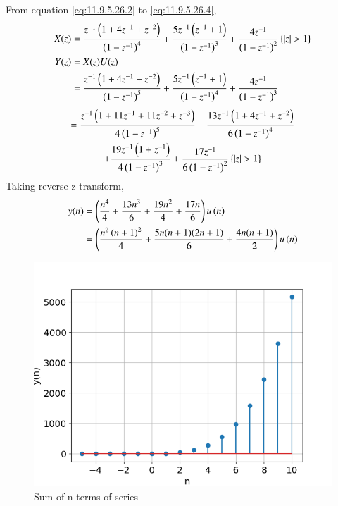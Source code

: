 \documentclass[journal,12pt,twocolumn]{IEEEtran}
\theoremstyle{remark}
\begin{document}
From equation \eqref{eq:11.9.5.26.2} to \eqref{eq:11.9.5.26.4},\\
    \begin{align}
        X(z) &= \frac{z^{-1}\brak{1+4z^{-1}+z^{-2}}}{\brak{1-z^{-1}}^4} + \frac{5z^{-1}\brak{z^{-1}+1}}{\brak{1-z^{-1}}^3} + \frac{4z^{-1}}{\brak{1-z^{-1}}^2} \cbrak{|z|>1}\\
         Y(z) &= X(z)U(z)\\
         &=\frac{z^{-1}\brak{1+4z^{-1}+z^{-2}}}{\brak{1-z^{-1}}^5} + \frac{5z^{-1}\brak{z^{-1}+1}}{\brak{1-z^{-1}}^4} + \frac{4z^{-1}}{\brak{1-z^{-1}}^3} 
    \end{align}
    \begin{multline}
        = \frac{z^{-1}\brak{1+11z^{-1}+11z^{-2}+z^{-3}}}{4\brak{1-z^{-1}}^5} +\frac{13z^{-1}\brak{1+4z^{-1}+z^{-2}}}{6\brak{1-z^{-1}}^4} \\
        + \frac{19z^{-1}\brak{1+z^{-1}}}{4\brak{1-z^{-1}}^3} + \frac{17z^{-1}}{6\brak{1-z^{-1}}^2} \cbrak{|z|>1}
    \end{multline}
    Taking reverse z transform,\\
    \begin{align}
        y(n) &= \left(\frac{n^4}{4} + \frac{13n^3}{6} + \frac{19n^2}{4} + \frac{17n}{6}\right) u\left(n\right)\\
        &= \left(\frac{n^2\left(n+1\right)^2}{4} + \frac{5n(n+1)(2n+1)}{6} 
        + \frac{4n(n+1)}{2}\right) u\left(n\right)
    \end{align}
    \begin{figure}[!h] 
    \centering
    \includegraphics[width=\columnwidth]{figs/sumplot.png}
    \caption{Sum of n terms of series}
    \label{fig:Graph1_math.11.9.4.8}
    \end{figure}
\end{document}
